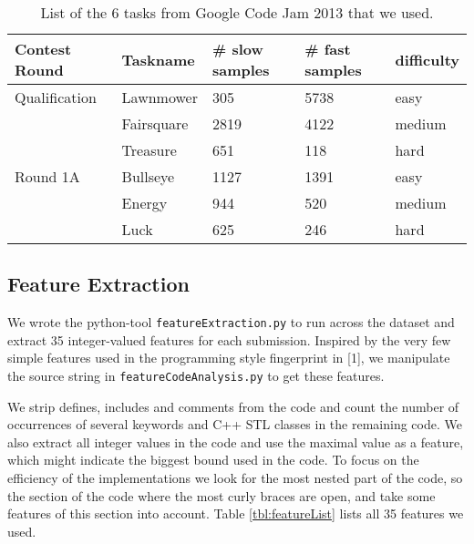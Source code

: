 \begin{table}
\caption{List of the 6 tasks from Google Code Jam 2013 that we used.}
\label{tbl:taskList}
\begin{center}
\begin{tabular}{|l|l|l|l|l|}
\hline
Contest Round & Taskname & \# slow samples & \# fast samples & difficulty \\
\hline
Qualification & Lawnmower &	305 &	5738 & easy\\
& Fairsquare &	2819	 & 4122 & medium \\
& Treasure	& 651 & 	118 & hard\\
\hline
Round 1A & Bullseye	&  1127	 & 1391 & easy\\
& Energy	 & 944 & 	520 & medium\\
& Luck & 	625 & 	246 & hard\\
\hline
\end{tabular}
\end{center}
\end{table}

\subsection*{Feature Extraction}
We wrote the python-tool \texttt{featureExtraction.py} to run across the dataset and extract 35 integer-valued features for each submission.
Inspired by the very few simple features used in the programming style fingerprint in [1], we manipulate the source string in \texttt{featureCodeAnalysis.py} to get these features.

We strip defines, includes and comments from the code and count the number of occurrences of several keywords and C++ STL classes in the remaining code.
We also extract all integer values in the code and use the maximal value as a feature, which might indicate the biggest bound used in the code.
To focus on the efficiency of the implementations we look for the most nested part of the code, so the section of the code where the most curly braces are open, and take some features of this section into account. Table \ref{tbl:featureList} lists all 35 features we used.

